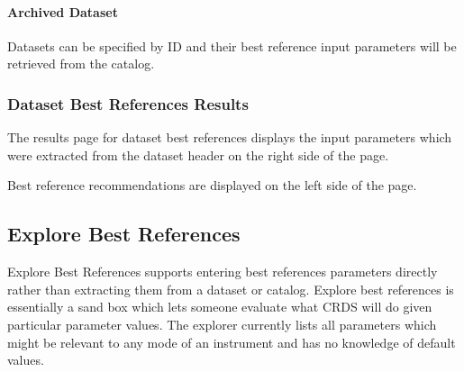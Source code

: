 \documentclass[letterpaper,10pt,english]{sphinxmanual}
\begin{document}
\paragraph{Archived Dataset}
\label{web_site_use:archived-dataset}
Datasets can be specified by ID and their best reference input parameters will
be retrieved from the catalog.


\subsubsection{Dataset Best References Results}
\label{web_site_use:dataset-best-references-results}\begin{figure}[htbp]
\centering

\end{figure}

The results page for dataset best references displays the input parameters which
were extracted from the dataset header on the right side of the page.

Best reference recommendations are displayed on the left side of the page.


\subsection{Explore Best References}
\label{web_site_use:explore-best-references}
Explore Best References supports entering best references parameters directly
rather than extracting them from a dataset or catalog.   Explore best references
is essentially a sand box which lets someone evaluate what CRDS will do given
particular parameter values.  The explorer currently lists all parameters
which might be relevant to any mode of an instrument and has no knowledge of
default values.
\end{document}
